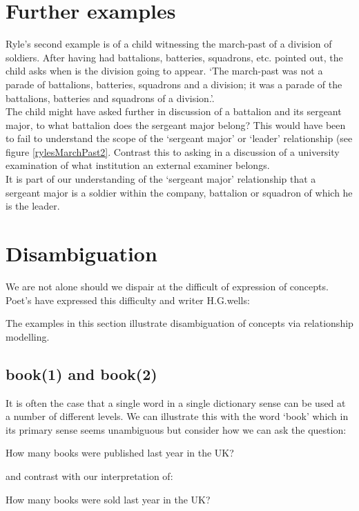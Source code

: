 \section{Further examples}

\noindent Ryle's second example is of a child witnessing the march-past of a division of soldiers. After having had battalions, batteries, squadrons, etc. pointed out, the child asks when is the division going to appear. `The march-past was not a parade of battalions, batteries, squadrons and a division; it was a parade of the battalions, batteries and squadrons of a division.'. \\

\noindent The child might have asked further in discussion of a battalion and its sergeant major, to what battalion does the sergeant major belong? This would have been to fail to understand the scope of the `sergeant major' or `leader' relationship (see figure \ref{rylesMarchPast2}. Contrast this to asking in a discussion of a university examination of what institution an external examiner belongs. \\

\noindent It is part of our understanding of the `sergeant major' relationship that a sergeant major is a soldier within the company, battalion or squadron of which he is the leader.



\section{Disambiguation}

\noindent We are not alone should we dispair at the difficult of expression of concepts. Poet's have expressed this difficulty and writer H.G.wells:

\noindent The examples in this section illustrate disambiguation of concepts via relationship modelling.

\subsection{book(1) and book(2)}

\noindent It is often the case that a single word in a single dictionary sense can be used at a number of different levels. 
We can illustrate this with the word `book' which in its primary sense seems unambiguous but consider how we can ask the question:
\begin{erquote}
How many books were published last year in the UK?
\end{erquote}
and contrast with our interpretation of:
\begin{erquote}
How many books were sold last year in the UK?
\end{erquote}

